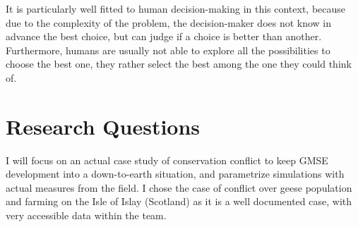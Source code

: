 \documentclass[12pt,a4paper]{article}
\begin{document}
It is particularly well fitted to human decision-making in this context, because due to the complexity of the problem, the decision-maker does not know in advance the best choice, but can judge if a choice is better than another.
Furthermore, humans are usually not able to explore all the possibilities to choose the best one, they rather select the best among the one they could think of.
%
%

\section{Research Questions}
I will focus on an actual case study of conservation conflict to keep GMSE development into a down-to-earth situation, and parametrize simulations with actual measures from the field.
I chose the case of conflict over geese population and farming on the Isle of Islay (Scotland) as it is a well documented case, with very accessible data within the team.
\end{document}
